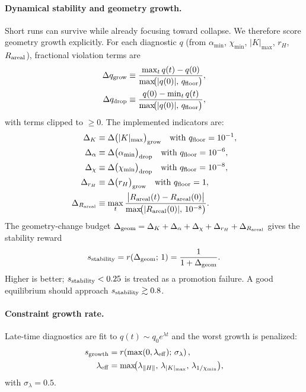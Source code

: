 \documentclass[twocolumn,floatfix,aps,prd,nofootinbib]{revtex4-2}
\begin{document}
\paragraph{Dynamical stability and geometry growth.}
Short runs can survive while already focusing toward collapse.  We therefore score geometry growth explicitly.  For each diagnostic $q$ (from $\alpha_{\min}$, $\chi_{\min}$, $|K|_{\max}$, $r_H$, $R_{\rm areal}$), fractional violation terms are
\begin{align}
    \Delta q_{\rm grow}
    &\equiv \frac{\max_t q(t) - q(0)}
            {\max\!\bigl(|q(0)|,\,q_{\rm floor}\bigr)}, \notag\\
    \Delta q_{\rm drop}
    &\equiv \frac{q(0) - \min_t q(t)}
            {\max\!\bigl(|q(0)|,\,q_{\rm floor}\bigr)},
\end{align}
with terms clipped to $\ge0$.  The implemented indicators are:
\begin{align}
    \Delta_K &\equiv \Delta\bigl(|K|_{\max}\bigr)_{\rm grow}
    \quad\text{with } q_{\rm floor} = 10^{-1}, \label{eq:delta_k}\\
    \Delta_\alpha &\equiv \Delta\bigl(\alpha_{\min}\bigr)_{\rm drop}
    \quad\text{with } q_{\rm floor} = 10^{-6}, \label{eq:delta_alpha}\\
    \Delta_\chi &\equiv \Delta\bigl(\chi_{\min}\bigr)_{\rm drop}
    \quad\text{with } q_{\rm floor} = 10^{-8}, \label{eq:delta_chi}\\
    \Delta_{r_H} &\equiv \Delta\bigl(r_H\bigr)_{\rm grow}
    \quad\text{with } q_{\rm floor} = 1, \label{eq:delta_rh}\\
    \Delta_{R_{\rm areal}} &\equiv \max_t \frac{\bigl|R_{\rm areal}(t) - R_{\rm areal}(0)\bigr|}{\max\!\bigl(|R_{\rm areal}(0)|,\,10^{-8}\bigr)}. \label{eq:delta_areal}
\end{align}
The geometry-change budget $\Delta_{\rm geom} = \Delta_K + \Delta_\alpha + \Delta_\chi + \Delta_{r_H} + \Delta_{R_{\rm areal}}$ gives the stability reward
\begin{equation}
    s_{\rm stability} = r(\Delta_{\rm geom};\,1) = \frac{1}{1 + \Delta_{\rm geom}}.
    \label{eq:s_stability}
\end{equation}
Higher is better; $s_{\rm stability}<0.25$ is treated as a promotion failure.  A good equilibrium should approach $s_{\rm stability}\gtrsim0.8$.

\paragraph{Constraint growth rate.}
Late-time diagnostics are fit to $q(t)\sim q_0 e^{\lambda t}$ and the worst growth is penalized:
\begin{equation}
    \begin{aligned}
    s_{\rm growth}
    &= r\!\left(\max(0,\lambda_{\rm eff});\,\sigma_\lambda\right),\\
    \lambda_{\rm eff}
    &= \max\!\bigl(\lambda_{\|H\|},\,\lambda_{|K|_{\max}},\,\lambda_{1/\chi_{\min}}\bigr),
    \end{aligned}
    \label{eq:s_growth}
\end{equation}
with $\sigma_\lambda=0.5$.
\end{document}
